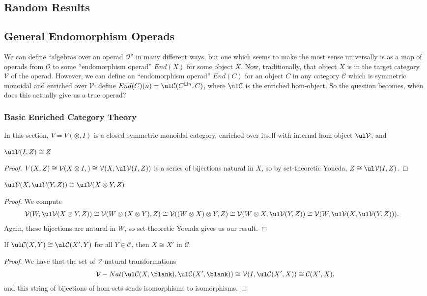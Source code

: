 \documentclass{report}
\renewcommand{\C}{\text{$\mathcal{C}$}}
\renewcommand{\O}{\text{$\mathcal{O}$}}
\newcommand{\V}{\text{$\mathcal{V}$}}
\begin{document}
\begin{appendices}
  \chapter{Random Results}
\section{General Endomorphism Operads}
We can define ``algebras over an operad $\O$'' in many different ways, but one which seems to make the most sense universally is as a map of operads from $\O$ to some ``endomorphism operad'' $End(X)$ for some object $X$. Now, traditionally, that object $X$ is in the target category $\V$ of the operad. However, we can define an ``endomorphism operad'' $End(C)$ for an object $C$ in any category $\C$ which is symmetric monoidal and enriched over $\V$: define $End(C)(n) = \ul\C(C^{\Box n},C)$, where $\ul\C$ is the enriched hom-object. So the question becomes, when does this actually give us a true operad?

\subsection{Basic Enriched Category Theory}
In this section, $V = V(\otimes, I)$ is a closed symmetric monoidal category, enriched over itself with internal hom object $\ul\V$, and 
\newcommand{\uV}{\text{$\ul\V$}}
\newcommand{\uC}{\text{$\ul\C$}}
\begin{lemma}\label{claim1}
  $\ul\V(I,Z) \cong Z$
\end{lemma}
\begin{proof}
  $V(X,Z)\cong \V(X\otimes I, ) \cong \V(X,\uV(I,Z))$ is a series of bijections natural in $X$, so by set-theoretic Yoneda, $Z\cong \uV(I,Z)$. 
\end{proof}

\begin{lemma}\label{claim2}
  $\uV(X,\uV(Y,Z))\cong\uV(X\otimes Y, Z)$
\end{lemma}
\begin{proof}
  We compute
  \begin{align*}
    \V(W,\uV(X\otimes Y,Z)) &\cong \V(W\otimes (X\otimes Y),Z)\cong \V((W\otimes X)\otimes Y,Z)\cong \V(W\otimes X, \uV(Y,Z))\cong \V(W,\uV(X,\uV(Y,Z))).
  \end{align*}
Again, these bijections are natural in $W$, so set-theoretic Yoenda gives us our result.
\end{proof}

\begin{lemma}\label{claim3}
  If $\uC(X,Y)\cong \uC(X',Y)$ for all $Y\in\C$, then $X\cong X'$ in $\C$.
\end{lemma}
\begin{proof}
  We have that the set of $\V$-natural transformations
\[\V-Nat(\uC(X,\blank), \ul\C(X',\blank)) \cong \V(I,\ul\C(X',X))\cong \C(X',X),\]
and this string of bijections of hom-sets sends isomorphisms to isomorphisms. 
\end{proof}


\end{appendices}
\end{document}
